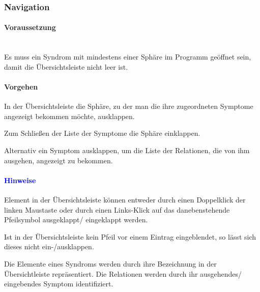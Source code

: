 \documentclass[enabledeprecatedfontcommands,fontsize=11pt,paper=a4,twoside]{scrartcl}
\newcounter{one}
\newcounter{two}[one]
\newcommand*{\hint}{\paragraph{\textcolor{blue}{Hinweise}}}
\newcommand*{\condition}{\paragraph{Voraussetzung}$\;$ \vspace{0.2cm}\\}
\newcommand*{\action}{\paragraph{Vorgehen}}
\let\tempone\itemize
\let\temptwo\enditemize
\renewenvironment{itemize}{\tempone\addtolength{\itemsep}{-10.0pt}}{\temptwo}
\let\origenumerate\enumerate
\let\origendenumerate\endenumerate
\renewenvironment{enumerate}{\origenumerate \addtolength{\itemsep}{-10.0pt}}{\origendenumerate}
\begin{document}
		\begin{figure}[ht!]
			\centering
			
		\end{figure}


\subsubsection{Navigation}		
	\condition
	Es muss ein Syndrom mit mindestens einer Sphäre im Programm geöffnet sein, damit die Übersichtsleiste nicht leer ist. 
	\action
	\begin{enumerate}
		\item In der Übersichtsleiste die Sphäre, zu der man die ihre zugeordneten Symptome angezeigt bekommen möchte, ausklappen. 
		\item Zum Schließen der Liste der Symptome die Sphäre einklappen. 
		\item Alternativ ein Symptom ausklappen, um die Liste der Relationen, die von ihm ausgehen, angezeigt zu bekommen. 
	\end{enumerate}
	\hint
	\begin{itemize}
		\item Element in der Übersichtsleiste können entweder durch einen Doppelklick der linken Maustaste oder durch einen Links-Klick auf das danebenstehende Pfeilsymbol ausgeklappt/ eingeklappt werden. 
		\item Ist in der Übersichtsleiste kein Pfeil vor einem Eintrag eingeblendet, so lässt sich dieses nicht ein-/ausklappen.
		\item Die Elemente eines Syndroms werden durch ihre Bezeichnung in der Übersichtleiste repräsentiert. Die Relationen werden durch ihr ausgehendes/ eingebendes Symptom identifiziert.\\
	\end{itemize}
		 
\end{document}
